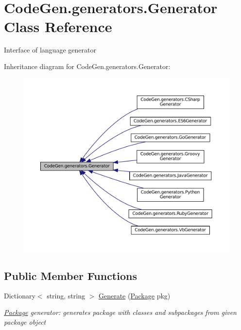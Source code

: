 \hypertarget{classCodeGen_1_1generators_1_1Generator}{}\section{Code\+Gen.\+generators.\+Generator Class Reference}
\label{classCodeGen_1_1generators_1_1Generator}


Interface of language generator  




Inheritance diagram for Code\+Gen.\+generators.\+Generator\+:
\nopagebreak
\begin{figure}[H]
\begin{center}
\leavevmode
\includegraphics[width=350pt]{classCodeGen_1_1generators_1_1Generator__inherit__graph}
\end{center}
\end{figure}
\subsection*{Public Member Functions}
\begin{DoxyCompactItemize}
\item 
Dictionary$<$ string, string $>$ \mbox{\hyperlink{classCodeGen_1_1generators_1_1Generator_a5c5f7f56cdb910dc5d71ed407f874d84}{Generate}} (\mbox{\hyperlink{classCodeGen_1_1generators_1_1Package}{Package}} pkg)
\begin{DoxyCompactList}\small\item\em \mbox{\hyperlink{classCodeGen_1_1generators_1_1Package}{Package}} generator\+: generates package with classes and subpackages from given package object \end{DoxyCompactList}\end{DoxyCompactItemize}
